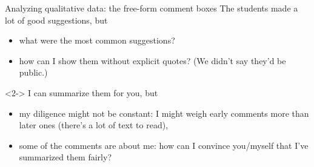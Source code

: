 \documentclass[aspectratio=169]{beamer}
\begin{document}
\begin{frame}{Analyzing qualitative data: the free-form comment boxes}
\vspace{0.5 cm}
The students made a lot of good suggestions, but
\begin{itemize}
\item what were the most common suggestions?
\item how can I show them without explicit quotes? (We didn't say they'd be public.)
\end{itemize}

\vspace{1 cm}
\begin{uncoverenv}<2->
I can summarize them for you, but
\begin{itemize}
\item my diligence might not be constant: I might weigh early comments more than later ones (there's a lot of text to read),
\item some of the comments are about me: how can I convince you/myself that I've summarized them fairly?
\end{itemize}
\end{uncoverenv}
\end{frame}
\end{document}
